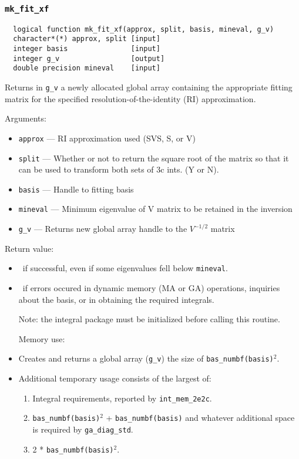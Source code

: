 \subsubsection{{\tt mk\_fit\_xf}}
\begin{verbatim}
  logical function mk_fit_xf(approx, split, basis, mineval, g_v)
  character*(*) approx, split [input]
  integer basis               [input]
  integer g_v                 [output]
  double precision mineval    [input]
\end{verbatim}
Returns in \verb+g_v+ a newly allocated global array containing the
appropriate fitting matrix for the specified
resolution-of-the-identity (RI) approximation.

 Arguments:
\begin{itemize}
\item \verb+approx+ --- RI approximation used (SVS, S, or V)
\item \verb+split+ ---  Whether or not to return the square root of the matrix
              so that it can be used to transform both sets of 3c ints.
              (Y or N).
\item \verb+basis+ --- Handle to fitting basis
\item \verb+mineval+ --- Minimum eigenvalue of V matrix to be retained in 
              the inversion
\item \verb+g_v+ ---  Returns new global array handle to the $V^{-1/2}$ matrix
\end{itemize}

Return value:
\begin{itemize}
\item \TRUE\ if successful, even if some eigenvalues fell below \verb+mineval+.
\item \FALSE\ if errors occured in dynamic memory (MA or GA) operations,
inquiries about the basis, or in obtaining the required integrals.

Note: the integral package must be initialized before calling this routine.

Memory use:
\item Creates and returns a global array (\verb+g_v+) the size of 
\verb+bas_numbf(basis)+$^2$.
\item Additional temporary usage consists of the largest of:
\begin{enumerate}
\item Integral requirements, reported by \verb+int_mem_2e2c+.
\item \verb+bas_numbf(basis)+$^2$ + \verb+bas_numbf(basis)+ and whatever additional
        space is required by \verb+ga_diag_std+.
\item 2 * \verb+bas_numbf(basis)+$^2$.
\end{enumerate}
\end{itemize}


